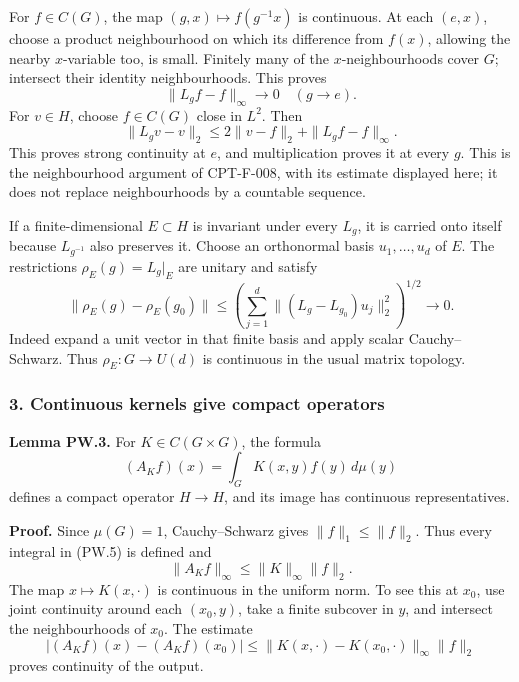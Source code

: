 \documentclass[
  11pt,
]{article}
\begin{document}
For \(f\in C(G)\), the map \((g,x)\mapsto f(g^{-1}x)\) is continuous. At
each \((e,x)\), choose a product neighbourhood on which its difference
from \(f(x)\), allowing the nearby \(x\)-variable too, is small.
Finitely many of the \(x\)-neighbourhoods cover \(G\); intersect their
identity neighbourhoods. This proves \[
\|L_gf-f\|_\infty\longrightarrow0\quad(g\longrightarrow e).
\tag{PW.3}
\] For \(v\in H\), choose \(f\in C(G)\) close in \(L^2\). Then \[
\|L_gv-v\|_2\leq2\|v-f\|_2+\|L_gf-f\|_\infty.
\] This proves strong continuity at \(e\), and multiplication proves it
at every \(g\). This is the neighbourhood argument of CPT-F-008, with
its estimate displayed here; it does not replace neighbourhoods by a
countable sequence.

If a finite-dimensional \(E\subset H\) is invariant under every \(L_g\),
it is carried onto itself because \(L_{g^{-1}}\) also preserves it.
Choose an orthonormal basis \(u_1,\ldots,u_d\) of \(E\). The
restrictions \(\rho_E(g)=L_g|_E\) are unitary and satisfy \[
\|\rho_E(g)-\rho_E(g_0)\|
\leq
\left(\sum_{j=1}^d\|(L_g-L_{g_0})u_j\|_2^2\right)^{1/2}
\longrightarrow0.
\tag{PW.4}
\] Indeed expand a unit vector in that finite basis and apply scalar
Cauchy--Schwarz. Thus \(\rho_E:G\to U(d)\) is continuous in the usual
matrix topology.

\subsubsection{3. Continuous kernels give compact
operators}\label{continuous-kernels-give-compact-operators}

\textbf{Lemma PW.3.} For \(K\in C(G\times G)\), the formula \[
(A_Kf)(x)=\int_G K(x,y)f(y)\,d\mu(y)
\tag{PW.5}
\] defines a compact operator \(H\to H\), and its image has continuous
representatives.

\textbf{Proof.} Since \(\mu(G)=1\), Cauchy--Schwarz gives
\(\|f\|_1\leq\|f\|_2\). Thus every integral in (PW.5) is defined and \[
\|A_Kf\|_\infty\leq\|K\|_\infty\|f\|_2.
\tag{PW.6}
\] The map \(x\mapsto K(x,\cdot)\) is continuous in the uniform norm. To
see this at \(x_0\), use joint continuity around each \((x_0,y)\), take
a finite subcover in \(y\), and intersect the neighbourhoods of \(x_0\).
The estimate \[
|(A_Kf)(x)-(A_Kf)(x_0)|
\leq\|K(x,\cdot)-K(x_0,\cdot)\|_\infty\|f\|_2
\] proves continuity of the output.
\end{document}
